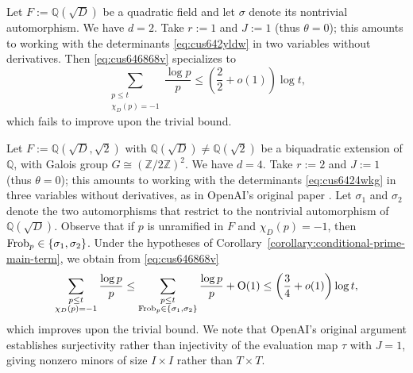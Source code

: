 \documentclass[reqno]{amsart} 
\begin{document}
\begin{example}\label{example:cus65nzxgy}
  Let $F := \mathbb{Q}(\sqrt{D})$ be a quadratic field and let $\sigma$ denote its nontrivial automorphism.  We have $d = 2$.  Take $r := 1$ and $J := 1$ (thus $\theta = 0$); this amounts to working with the determinants \eqref{eq:cus642yldw} in two variables without derivatives.  Then \eqref{eq:cus646868v} specializes to
  \begin{equation*}
    \sum_{
      \substack{
        p \leq t  \\
        \chi_D(p) = - 1
      }
    }
    \frac{\log p}{p} \leq
    \left( \frac{2}{2} + o(1) \right) \log t,  
  \end{equation*}
  which fails to improve upon the trivial bound.
\end{example}
\begin{example}\label{example:cus65n1pf9}
  Let $F := \mathbb{Q}(\sqrt{D}, \sqrt{2})$ with $\mathbb{Q}(\sqrt{D}) \neq \mathbb{Q}(\sqrt{2})$ be a biquadratic extension of $\mathbb{Q}$, with Galois group $G \cong (\mathbb{Z}/2\mathbb{Z})^2$.  We have $d = 4$.  Take $r := 2$ and $J := 1$ (thus $\theta = 0$); this amounts to working with the determinants \eqref{eq:cus6424wkg} in three variables without derivatives, as in OpenAI's original paper \cite{OAI:Uniform-exclusion-of-Landau-Siegel-zeros-October-1-2026}.  Let $\sigma_1$ and $\sigma_2$ denote the two automorphisms that restrict to the nontrivial automorphism of $\mathbb{Q}(\sqrt{D})$.  Observe that if $p$ is unramified in $F$ and $\chi_D(p) = - 1$, then $\operatorname{Frob}_p \in \{\sigma_1, \sigma_2\}$.  Under the hypotheses of Corollary~\ref{corollary:conditional-prime-main-term}, we obtain from \eqref{eq:cus646868v}
  \begin{equation*}
    \sum_{
      \substack{
        p \leq t  \\
        \chi_D(p) = - 1
      }
    }
    \frac{\log p}{p}
    \leq 
    \sum_{
      \substack{
        p \leq t  \\
        \operatorname{Frob}_p \in \{\sigma_1, \sigma_2\}        
      }
    }
    \frac{\log p}{p}
    + \operatorname{O}(1)
    \leq \left( \frac{3}{4} + o(1) \right) \log t,
  \end{equation*}
  which improves upon the trivial bound.  We note that OpenAI's original argument establishes surjectivity rather than injectivity of the evaluation map $\tau$ with $J = 1$, giving nonzero minors of size $I \times I$ rather than $T \times T$.
\end{example}
\end{document}
